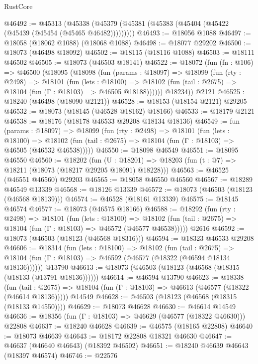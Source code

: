 \begin{lexlean}{RustCore}
\begin{coremodule}
@46492 := @45313
    (@45338 (@45379 (@45381 (@45383 (@45404 (@45422 (@45439 (@45454 (@45465 @46482)))))))))
@46493 := @18056 @1088
@46497 := @18058 (@18062 @1088) (@18068 @1088)
@46498 := @18077 @29202
@46500 := @18073 (@46498 @18092)
@46502 := @18115 (@18116 @1088)
@46503 := @18111 @46502
@46505 := @18073 (@46503 @18141)
@46522 := @18072
    (fun (fn : @106) =>
    @46500
      (@18095
        (@18098
          (fun (params : @18097) =>
          @18099
            (fun (rty : @2498) =>
            @18101
              (fun (lets : @18100) =>
              @18102 (fun (tail : @2675) => @18104 (fun (Γ : @18103) => @46505 @18188))))))
        @18234))
    @2121
@46525 := @18240 (@46498 (@18090 @2121))
@46528 := @18153 (@18154 @2121) @29205
@46532 := @18073 (@18145 (@46528 @18162) @18166)
@46533 := @18179 @2121
@46538 := @18176 (@18178 @46533 @29208 @18134 @18136)
@46549 := fun (params : @18097) =>
  @18099
    (fun (rty : @2498) =>
    @18101
      (fun (lets : @18100) =>
      @18102 (fun (tail : @2675) => @18104 (fun (Γ : @18103) => @46505 (@46532 @46538)))))
@46550 := @18098 @46549
@46551 := @18095 @46550
@46560 := @18202
    (fun (U : @18201) => @18203 (fun (t : @7) => @18211 (@18073 (@18217 @29205 @18091) @18228)))
@46563 := @46525 (@46551 @46560) @29203
@46565 := @18058 @46550 @46560
@46567 := @18289 @46549 @13339
@46568 := @18126 @13339
@46572 := @18073 (@46503 (@18123 (@46568 @18139)))
@46574 := @46528 (@18161 @13339)
@46575 := @18145 @46574
@46577 := @18073 (@46575 @18166)
@46588 := @18292
    (fun (rty : @2498) =>
    @18101
      (fun (lets : @18100) =>
      @18102 (fun (tail : @2675) => @18104 (fun (Γ : @18103) => @46572 (@46577 @46538)))))
    @2616
@46592 := @18073 (@46503 (@18123 (@46568 @18316)))
@46594 := @18323 @46533 @29208
@46606 := @18314
    (fun (lets : @18100) =>
    @18102
      (fun (tail : @2675) =>
      @18104 (fun (Γ : @18103) => @46592 (@46577 (@18322 (@46594 @18134 @18136))))))
    @13790
@46613 := @18073 (@46503 (@18123 (@46568 (@18315 (@18133 (@13791 @18136))))))
@46614 := @46594 @13790
@46623 := @18338
    (fun (tail : @2675) => @18104 (fun (Γ : @18103) => @46613 (@46577 (@18322 (@46614 @18136)))))
    @14549
@46628 := @46503 (@18123 (@46568 (@18315 (@18133 @14550))))
@46629 := @18073 @46628
@46630 := @46614 @14549
@46636 := @18356 (fun (Γ : @18103) => @46629 (@46577 (@18322 @46630))) @22808
@46637 := @18240 @46628
@46639 := @46575 (@18165 @22808)
@46640 := @18073 @46639
@46643 := @18172 @22808 @18321 @46630
@46647 := @46637 (@46640 @46643) (@18392 @46502)
@46651 := @18240 @46639 @46643 (@18397 @46574)
@46746 := @22576

\end{coremodule}
\end{lexlean}
